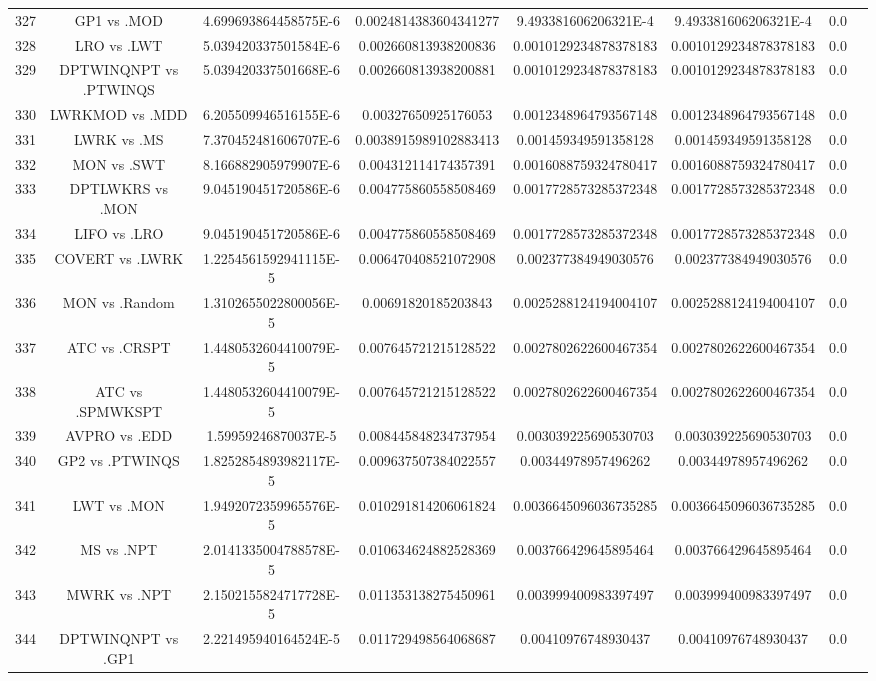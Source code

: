 \documentclass[a3paper,10pt]{article}
\begin{document}
\begin{table}[!htp]
\begin{tabular}{cccccccc}
327&GP1 vs .MOD&4.699693864458575E-6&0.0024814383604341277&9.493381606206321E-4&9.493381606206321E-4&0.0\\
328&LRO vs .LWT&5.039420337501584E-6&0.002660813938200836&0.0010129234878378183&0.0010129234878378183&0.0\\
329&DPTWINQNPT vs .PTWINQS&5.039420337501668E-6&0.002660813938200881&0.0010129234878378183&0.0010129234878378183&0.0\\
330&LWRKMOD vs .MDD&6.205509946516155E-6&0.00327650925176053&0.0012348964793567148&0.0012348964793567148&0.0\\
331&LWRK vs .MS&7.370452481606707E-6&0.0038915989102883413&0.001459349591358128&0.001459349591358128&0.0\\
332&MON vs .SWT&8.166882905979907E-6&0.004312114174357391&0.0016088759324780417&0.0016088759324780417&0.0\\
333&DPTLWKRS vs .MON&9.045190451720586E-6&0.004775860558508469&0.0017728573285372348&0.0017728573285372348&0.0\\
334&LIFO vs .LRO&9.045190451720586E-6&0.004775860558508469&0.0017728573285372348&0.0017728573285372348&0.0\\
335&COVERT vs .LWRK&1.2254561592941115E-5&0.006470408521072908&0.002377384949030576&0.002377384949030576&0.0\\
336&MON vs .Random&1.3102655022800056E-5&0.00691820185203843&0.0025288124194004107&0.0025288124194004107&0.0\\
337&ATC vs .CRSPT&1.4480532604410079E-5&0.007645721215128522&0.0027802622600467354&0.0027802622600467354&0.0\\
338&ATC vs .SPMWKSPT&1.4480532604410079E-5&0.007645721215128522&0.0027802622600467354&0.0027802622600467354&0.0\\
339&AVPRO vs .EDD&1.59959246870037E-5&0.008445848234737954&0.003039225690530703&0.003039225690530703&0.0\\
340&GP2 vs .PTWINQS&1.8252854893982117E-5&0.009637507384022557&0.00344978957496262&0.00344978957496262&0.0\\
341&LWT vs .MON&1.9492072359965576E-5&0.010291814206061824&0.0036645096036735285&0.0036645096036735285&0.0\\
342&MS vs .NPT&2.0141335004788578E-5&0.010634624882528369&0.003766429645895464&0.003766429645895464&0.0\\
343&MWRK vs .NPT&2.1502155824717728E-5&0.011353138275450961&0.003999400983397497&0.003999400983397497&0.0\\
344&DPTWINQNPT vs .GP1&2.221495940164524E-5&0.011729498564068687&0.00410976748930437&0.00410976748930437&0.0\\

\end{tabular}
\end{table}
\end{document}
